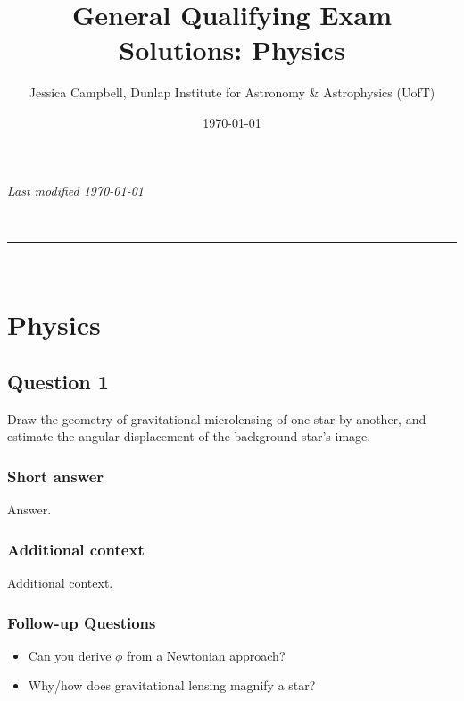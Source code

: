 \documentclass[a4paper,10pt]{article}
\makeatletter
\newcommand{\linia}{\rule{\linewidth}{0.5pt}}
\renewcommand{\maketitle}{
\begin{center}
\vspace{2ex}
{\huge \textsc{\@title}}
\vspace{1ex}
\\
\linia\\
\@author
\vspace{4ex}
\end{center}
}
\makeatother
\begin{document}
\hfill{\textit{Last modified \today}}
\title{General Qualifying Exam Solutions: Physics}
\author{Jessica Campbell, Dunlap Institute for Astronomy \& Astrophysics (UofT)}
\date{\today}
\maketitle

\tableofcontents



%
%
%
%

\newpage
\section{Physics}


\subsection{Question 1}

Draw the geometry of gravitational microlensing of one star by another, and estimate the angular displacement of the background star's image.

\subsubsection{Short answer}

Answer.

\subsubsection{Additional context}

Additional context.

\subsubsection{Follow-up Questions}

\begin{itemize}
    \item Can you derive $\phi$ from a Newtonian approach?
    \item Why/how does gravitational lensing magnify a star?
\end{itemize}
\end{document}
